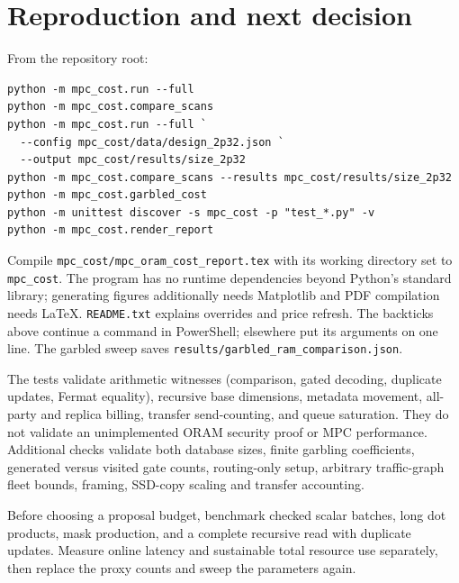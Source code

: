 \documentclass[11pt]{article}
\begin{document}






\section{Reproduction and next decision}
From the repository root:
\begin{verbatim}
python -m mpc_cost.run --full
python -m mpc_cost.compare_scans
python -m mpc_cost.run --full `
  --config mpc_cost/data/design_2p32.json `
  --output mpc_cost/results/size_2p32
python -m mpc_cost.compare_scans --results mpc_cost/results/size_2p32
python -m mpc_cost.garbled_cost
python -m unittest discover -s mpc_cost -p "test_*.py" -v
python -m mpc_cost.render_report
\end{verbatim}
Compile \texttt{mpc\_cost/mpc\_oram\_cost\_report.tex} with its working directory
set to \texttt{mpc\_cost}. The program has no runtime dependencies beyond Python's
standard library; generating figures additionally needs Matplotlib and PDF
compilation needs LaTeX. \texttt{README.txt} explains overrides and price refresh.
The backticks above continue a command in PowerShell; elsewhere put its arguments
on one line. The garbled sweep saves \texttt{results/garbled\_ram\_comparison.json}.

The tests validate arithmetic witnesses (comparison, gated decoding, duplicate
updates, Fermat equality), recursive base dimensions, metadata movement, all-party
and replica billing, transfer send-counting, and queue saturation. They do not
validate an unimplemented ORAM security proof or MPC performance.
Additional checks validate both database sizes, finite garbling coefficients,
generated versus visited gate counts, routing-only setup, arbitrary traffic-graph
fleet bounds, framing, SSD-copy scaling and transfer accounting.

Before choosing a proposal budget, benchmark checked scalar batches, long dot
products, mask production, and a complete recursive read with duplicate updates.
Measure online latency and sustainable total resource use separately, then replace
the proxy counts and sweep the parameters again.
\end{document}
